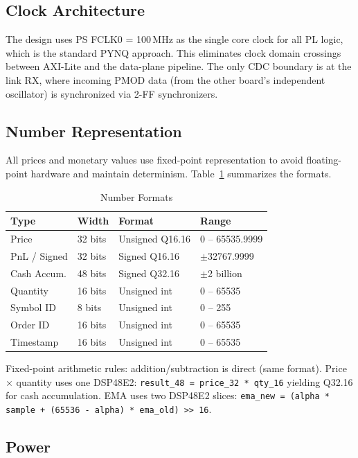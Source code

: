 \documentclass[conference]{IEEEtran}
\begin{document}
\subsection{Clock Architecture}

The design uses PS FCLK0 = 100\,MHz as the single core clock for all PL logic, which is the standard PYNQ approach. This eliminates clock domain crossings between AXI-Lite and the data-plane pipeline. The only CDC boundary is at the link RX, where incoming PMOD data (from the other board's independent oscillator) is synchronized via 2-FF synchronizers.

\subsection{Number Representation}

All prices and monetary values use fixed-point representation to avoid floating-point hardware and maintain determinism. Table~\ref{tab:numfmt} summarizes the formats.

\begin{table}[h]
\centering
\caption{Number Formats}
\label{tab:numfmt}
\begin{tabular}{@{}llll@{}}
\toprule
\textbf{Type} & \textbf{Width} & \textbf{Format} & \textbf{Range} \\
\midrule
Price           & 32 bits & Unsigned Q16.16 & 0 -- 65535.9999 \\
PnL / Signed    & 32 bits & Signed Q16.16   & $\pm$32767.9999 \\
Cash Accum.     & 48 bits & Signed Q32.16   & $\pm$2 billion \\
Quantity        & 16 bits & Unsigned int    & 0 -- 65535 \\
Symbol ID       & 8 bits  & Unsigned int    & 0 -- 255 \\
Order ID        & 16 bits & Unsigned int    & 0 -- 65535 \\
Timestamp       & 16 bits & Unsigned int    & 0 -- 65535 \\
\bottomrule
\end{tabular}
\end{table}

Fixed-point arithmetic rules: addition/subtraction is direct (same format). Price $\times$ quantity uses one DSP48E2: \texttt{result\_48 = price\_32 * qty\_16} yielding Q32.16 for cash accumulation. EMA uses two DSP48E2 slices: \texttt{ema\_new = (alpha * sample + (65536 - alpha) * ema\_old) >> 16}.

\subsection{Power}
\end{document}
